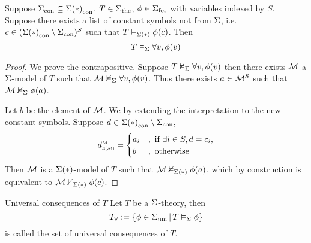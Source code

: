 \begin{lem}
    Suppose ${\Sigma}_\mathrm{con} \subseteq {\Sigma(*)}_\mathrm{con}$, 
    $T \in {\Sigma}_\mathrm{the}$, $\phi \in {\Sigma}_\mathrm{for}$
    with variables indexed by $S$.
    Suppose there exists a list of constant symbols not from $\Sigma$, 
    i.e. $c \in ({\Sigma(*)}_\mathrm{con}\setminus {\Sigma}_\mathrm{con})^S$ 
    such that $T \vDash_{\Sigma(*)} \phi(c)$.
    Then \[
        T \vDash_{\Sigma} \forall v, \phi(v)
    \]
\end{lem}
\begin{proof}
    We prove the contrapositive.
    Suppose $T \nvDash_{\Sigma} \forall v, \phi(v)$
    then there exists $\mathcal{M}$ a $\Sigma$-model of $T$
    such that $\mathcal{M} \nvDash_{\Sigma} \forall v, \phi(v)$.
    Thus there exists $a \in \mathcal{M}^S$ 
    such that $\mathcal{M} \nvDash_{\Sigma} \phi(a)$.

    Let $b$ be the element of ${\mathcal{M}}$.
    We  
    by extending the interpretation 
    to the new constant symbols.
    Suppose $d \in {\Sigma(*)}_\mathrm{con} \setminus {\Sigma}_\mathrm{con}$,
    \[
        \subintp{\Si(\MM)}{\MM}{d} = 
        \begin{cases}
            a_i &, \text{ if } \exists i \in S, d = c_i,\\
            b &, \text{ otherwise} 
        \end{cases}
    \]
    Then $\mathcal{M}$ is a $\Sigma(*)$-model of $T$ such that 
    $\mathcal{M} \nvDash_{\Sigma(*)} \phi(a)$, 
    which by construction is equivalent to 
    $\mathcal{M} \nvDash_{\Sigma(*)} \phi(c)$.
\end{proof}

\begin{nttn}{Universal consequences of $T$}
    Let $T$ be a $\Sigma$-theory, then 
    \[T_\forall := \left\{\phi \in {\Sigma}_\mathrm{uni} \,|\, T \vDash_{\Sigma} \phi\right\}\]
    is called the set of universal consequences of $T$.
\end{nttn}

